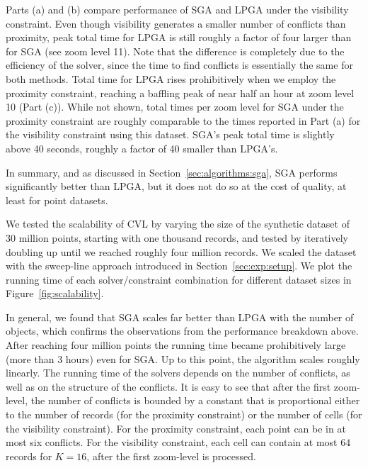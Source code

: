 Parts (a) and (b) compare performance of SGA and LPGA under the visibility constraint. Even though visibility generates a smaller number of conflicts than proximity, peak total time for LPGA is still roughly a factor of four larger than for SGA (see zoom level 11). Note that the difference is completely due to the efficiency of the solver, since the time to find conflicts is essentially the same for both methods. Total time for LPGA rises prohibitively when we employ the proximity constraint, reaching a baffling peak of near half an hour at zoom level 10 (Part (c)). While not shown, total times per zoom level for SGA under the proximity constraint are roughly comparable to the times reported in Part (a) for the visibility constraint using this dataset. SGA's peak total time is slightly above 40 seconds, roughly a factor of 40 smaller than LPGA's.         

In summary, and as discussed in Section~\ref{sec:algorithms:sga}, SGA performs significantly better than LPGA, but it does not do so at the cost of quality, at least for point datasets.


We tested the scalability of CVL by varying the size of the synthetic dataset of 30 million points, starting with one thousand records, and tested by iteratively doubling up until we reached roughly four million records. We scaled the dataset with the sweep-line approach introduced in Section~\ref{sec:exp:setup}. We plot the running time of each solver/constraint combination for different dataset sizes in Figure~\ref{fig:scalability}.

In general, we found that SGA scales far better than LPGA with the number of objects, which confirms the observations from the performance breakdown above. After reaching four million points the running time became prohibitively large (more than 3 hours) even for SGA. Up to this point, the algorithm scales roughly linearly. The running time of the solvers depends on the number of conflicts, as well as on the structure of the conflicts. It is easy to see that after the first zoom-level, the number of conflicts is bounded by a constant that is proportional either to the number of records (for the proximity constraint) or the number of cells (for the visibility constraint). For the proximity constraint, each point can be in at most six conflicts. For the visibility constraint, each cell can contain at most $64$ records for $K=16$, after the first zoom-level is processed.

